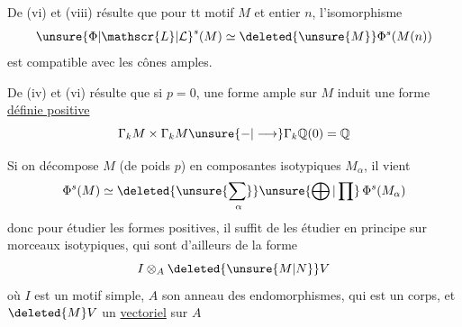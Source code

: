 De (vi) et (viii) résulte que pour tt motif $M$ et entier $n$, l'isomorphisme
\[
\unsure{\Phi|\mathscr{L}|\mathcal{L}}^s(M)\simeq\deleted{\unsure{M}}\Phi^s(M(n))
\]
est compatible avec les cônes amples.

De (iv) et (vi) résulte que si $p=0$, une forme ample sur $M$ induit une forme \uline{définie positive}
\[
\Gamma_k M\times\Gamma_k M\unsure{\mathbin{-}|\longrightarrow}\Gamma_k\mathbb{Q}(0)=\mathbb{Q}
\]

Si on décompose $M$ (de poids $p$) en composantes isotypiques $M_\alpha$, il vient
\[
\Phi^s(M)\simeq\mathop{\deleted{\unsure{\sum}}\unsure{\bigoplus|\prod}}\limits_\alpha\Phi^s(M_\alpha)
\]
donc pour étudier les formes positives, il suffit de les étudier en principe sur  morceaux isotypiques, qui sont d'ailleurs de la forme
\[
I\otimes_A\deleted{\unsure{M|N}}V
\]
où $I$ est un motif simple, $A$ son anneau des endomorphismes, qui est un corps, et $\deleted{M}V$ un \uline{vectoriel} sur $A$
